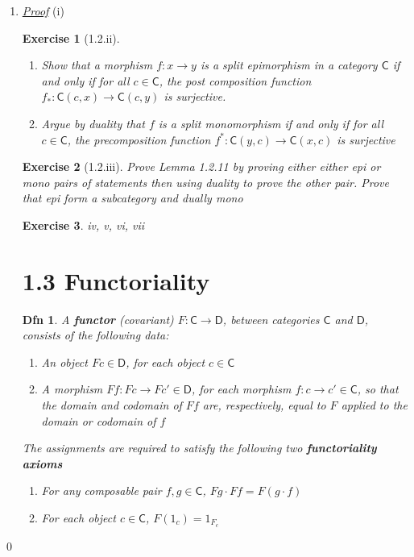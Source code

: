\documentclass{article}
\theoremstyle{spacious}
\newtheorem*{dfn}{Dfn}
\newtheorem*{prm}{Exercise}
\newenvironment{pf}{\begin{enumerate} \item[] \textit{\underline{Proof}} }{\end{enumerate}\qed}
\renewcommand{\:}{\vcentcolon=} %
\begin{document}
\begin{pf}{(i)}
\begin{prm}[1.2.ii]
    \begin{enumerate}
        \item Show that a morphism \(f:x\to y \) is a split epimorphism in a category \(\mathsf{C}\) if and only if for all \(c\in \mathsf{C}\), the post composition function \(f_*: \mathsf{C}\left(c,x\right)\to \mathsf{C}\left(c,y\right)\) is surjective.
        \item Argue by duality that \(f\) is a split monomorphism if and only if for all \(c\in \mathsf{C}\), the precomposition function \(f^*: \mathsf{C}\left(y,c\right) \to \mathsf{C} \left(x,c\right)\) is surjective
    \end{enumerate}
\end{prm}

\begin{prm}[1.2.iii] Prove Lemma 1.2.11 by proving either either epi or mono pairs of statements then using duality to prove the other pair.  Prove that epi form a subcategory and dually mono
\end{prm}

\begin{prm}
    iv, v, vi, vii
\end{prm}

\section*{1.3 Functoriality}

\begin{dfn} A \textbf{functor} (covariant) \(F: \mathsf{C} \to \mathsf{D}\), between categories $\mathsf{C}$ and \(\mathsf{D}\), consists of the following data:
\begin{enumerate}
    \item[] An object \(Fc\in \mathsf{D}\), for each object \(c\in \mathsf{C}\)
    \item[] A morphism \(Ff:Fc\to Fc' \in \mathsf{D}\), for each morphism \(f:c\to c' \in \mathsf{C}\), so that the domain and codomain of \(Ff\) are, respectively, equal to \(F\) applied to the domain or codomain of \(f\)
\end{enumerate}
The assignments are required to satisfy the following two \textbf{functoriality axioms}
\begin{enumerate}
    \item[] For any composable pair \(f,g \in \mathsf{C}\), \(Fg\cdot Ff=F \left(g\cdot f\right)\)
    \item[] For each object \(c\in \mathsf{C}\), \(F \left(1_c\right)=1_{F_c}\)
\end{enumerate}
\end{dfn}


\end{pf}
\end{document}
